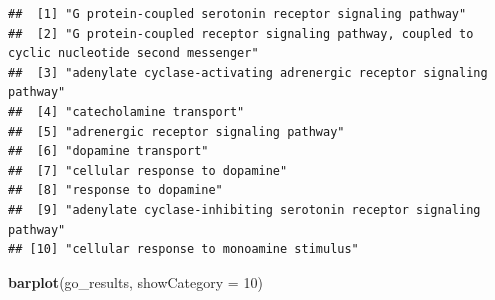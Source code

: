 \documentclass[
]{article}
\newenvironment{Shaded}{\begin{snugshade}}{\end{snugshade}}
\newcommand{\AttributeTok}[1]{\textcolor[rgb]{0.13,0.29,0.53}{#1}}
\newcommand{\CommentTok}[1]{\textcolor[rgb]{0.56,0.35,0.01}{\textit{#1}}}
\newcommand{\DecValTok}[1]{\textcolor[rgb]{0.00,0.00,0.81}{#1}}
\newcommand{\FunctionTok}[1]{\textcolor[rgb]{0.13,0.29,0.53}{\textbf{#1}}}
\newcommand{\NormalTok}[1]{#1}
\newcommand{\OtherTok}[1]{\textcolor[rgb]{0.56,0.35,0.01}{#1}}
\newcommand{\SpecialCharTok}[1]{\textcolor[rgb]{0.81,0.36,0.00}{\textbf{#1}}}
\newcommand{\StringTok}[1]{\textcolor[rgb]{0.31,0.60,0.02}{#1}}
\begin{document}
\begin{Shaded}
\end{Shaded}

\begin{verbatim}
##  [1] "G protein-coupled serotonin receptor signaling pathway"                                     
##  [2] "G protein-coupled receptor signaling pathway, coupled to cyclic nucleotide second messenger"
##  [3] "adenylate cyclase-activating adrenergic receptor signaling pathway"                         
##  [4] "catecholamine transport"                                                                    
##  [5] "adrenergic receptor signaling pathway"                                                      
##  [6] "dopamine transport"                                                                         
##  [7] "cellular response to dopamine"                                                              
##  [8] "response to dopamine"                                                                       
##  [9] "adenylate cyclase-inhibiting serotonin receptor signaling pathway"                          
## [10] "cellular response to monoamine stimulus"
\end{verbatim}

\begin{Shaded}
\begin{Highlighting}[]
\FunctionTok{barplot}\NormalTok{(go\_results, }\AttributeTok{showCategory =} \DecValTok{10}\NormalTok{)}
\end{Highlighting}
\end{Shaded}
\end{document}
